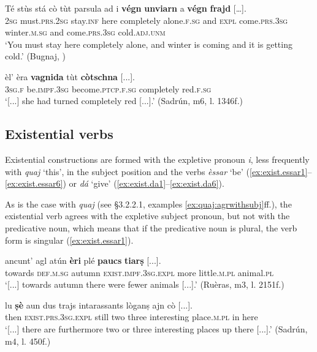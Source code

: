 \ea
\label{ex:cop:8}
\gll    Té stùs stá cò tùt parsula ad i \textbf{végn} \textbf{unviarn} a \textbf{végn} \textbf{frajd} […].\\
    \textsc{2sg} must.\textsc{prs.2sg} stay.\textsc{inf} here completely alone.\textsc{f.sg} and \textsc{expl} come.\textsc{prs.3sg} winter.\textsc{m.sg} and come.\textsc{prs.3sg} cold.\textsc{adj.unm}  \\
\glt `You must stay here completely alone, and winter is coming and it is getting cold.' (Bugnaj, \citealt[145]{Büchli1966})
\z

\ea
\label{ex:cop:9}
\gll  [...] èl’ èra \textbf{vagnida} tùt \textbf{còtschna} [...].\\
{} \textsc{3sg.f} be.\textsc{impf.3sg} become.\textsc{ptcp.f.sg} completely red.\textsc{f.sg}\\
\glt `[...] she had turned completely red [...].' (Sadrún, m6, l. 1346f.)
\z

\subsection{Existential verbs}
Existential constructions are formed with the expletive pronoun \textit{i}, less frequently with \textit{quaj} `this', in the subject position and the verbs \textit{èssar} `be' (\ref{ex:exist.essar1}--\ref{ex:exist.essar6}) or \textit{dá} `give' (\ref{ex:exist.da1}--\ref{ex:exist.da6}).

As is the case with \textit{quaj} (see §3.2.2.1, examples \ref{ex:quaj:agrwithsubj}ff.), the existential verb agrees with the expletive subject pronoun, but not with the predicative noun, which means that if the predicative noun is plural, the verb form is singular (\ref{ex:exist.essar1}).

\ea
\label{ex:exist.essar1}
\gll [...] ancunt’ agl atún \textbf{èri} plé \textbf{paucs} \textbf{tiarṣ} [...].\\
 {} towards \textsc{def.m.sg} autumn \textsc{exist.impf.3sg.expl} more little.\textsc{m.pl} animal.\textsc{pl} \\
\glt `[...] towards autumn there were fewer animals [...].' (Ruèras, m3, l. 2151f.)
\z

\ea
\label{ex:exist.essar2}
\gll [...] lu \textbf{ṣè} aun dus trajs intarassants lòganṣ ajn cò [...].\\
{} then \textsc{exist.prs.3sg.expl} still two three interesting place.\textsc{m.pl} in here\\
\glt `[...] there are furthermore two or three interesting places up there [...].' (Sadrún, m4, l. 450f.)
\z

